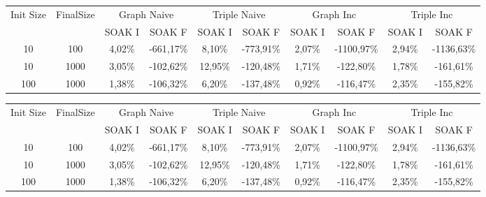 \begin{sidewaystable}
	\begin{tabular}{c|c|cc|cc|cc|cc} %
	  	\hline
		Init Size&FinalSize &\multicolumn{2}{c}{Graph Naive}  &\multicolumn{2}{c}{Triple Naive}&\multicolumn{2}{c}{Graph Inc}  &\multicolumn{2}{c}{Triple Inc}\\\
		&& SOAK I & SOAK F& SOAK I & SOAK F& SOAK I & SOAK F& SOAK I & SOAK F\\
		\hline
		\hline
		10	&100	&4,02\%&\cellcolor[HTML]{C0C0C0}	-661,17\%&	8,10\%&\cellcolor[HTML]{C0C0C0}-773,91\%&	2,07\%&	\cellcolor[HTML]{C0C0C0}-1100,97\%&	2,94\%&\cellcolor[HTML]{C0C0C0}	-1136,63\%\\	
		10	&1000	&3,05\%&\cellcolor[HTML]{C0C0C0}	-102,62\%&	12,95\%&\cellcolor[HTML]{C0C0C0}	-120,48\%&	1,71\%&	\cellcolor[HTML]{C0C0C0}-122,80\%&	1,78\%&\cellcolor[HTML]{C0C0C0}-161,61\%	\\
		100	&1000&	1,38\%&\cellcolor[HTML]{C0C0C0}-106,32\%&	6,20\%&\cellcolor[HTML]{C0C0C0}-137,48\%&	0,92\%&\cellcolor[HTML]{C0C0C0}-116,47\%&	2,35\%&	\cellcolor[HTML]{C0C0C0}-155,82\%	\\

		\hline %
	\end{tabular}
	\caption[\textsc{Analyser} Investigation Stack - Level 1 - Step Response Test Maximum Latency Comparison]{\textsc{Analyser} Investigation Stack - Level 1 Step Response Test maximum latency comparison }
	\label{tab:step_latency_comparisons_max}
	

	\begin{tabular}{c|c|cc|cc|cc|cc} %
	  	\hline
		Init Size&FinalSize &\multicolumn{2}{c}{Graph Naive}  &\multicolumn{2}{c}{Triple Naive}&\multicolumn{2}{c}{Graph Inc}  &\multicolumn{2}{c}{Triple Inc}\\\
		&& SOAK I & SOAK F& SOAK I & SOAK F& SOAK I & SOAK F& SOAK I & SOAK F\\
		\hline
		\hline
		10	&100	&4,02\%&\cellcolor[HTML]{C0C0C0}	-661,17\%&	8,10\%&\cellcolor[HTML]{C0C0C0}	-773,91\%&	2,07\%&	\cellcolor[HTML]{C0C0C0}-1100,97\%&	2,94\%&\cellcolor[HTML]{C0C0C0}	-1136,63\%\\	
		10	&1000	&3,05\%&	\cellcolor[HTML]{C0C0C0}-102,62\%&	12,95\%&	\cellcolor[HTML]{C0C0C0}-120,48\%&	1,71\%&	\cellcolor[HTML]{C0C0C0}-122,80\%&	1,78\%&\cellcolor[HTML]{C0C0C0}	-161,61\%	\\
		100	&1000&	1,38\%&	\cellcolor[HTML]{C0C0C0}-106,32\%&	6,20\%&\cellcolor[HTML]{C0C0C0}	-137,48\%&	0,92\%&\cellcolor[HTML]{C0C0C0}	-116,47\%&	2,35\%&	\cellcolor[HTML]{C0C0C0}-155,82\%	\\

		\hline %
	\end{tabular}
	\caption[\textsc{Analyser} Investigation Stack - Level 1 - Step Response Test Maximum Memory Comparison]{\textsc{Analyser} Investigation Stack - Level 1 Step Response Test maximum memory comparison }

	\label{tab:step_memory_comparisons_max}

	
\end{sidewaystable}